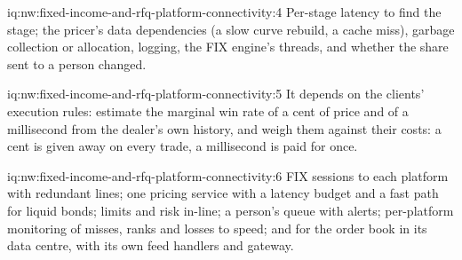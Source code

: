 \begin{solution}{iq:nw:fixed-income-and-rfq-platform-connectivity:4}
Per-stage latency to find the stage; the pricer's data dependencies (a slow curve rebuild, a cache miss), garbage collection or
allocation, logging, the FIX engine's threads, and whether the share sent to a person changed.
\end{solution}

\begin{solution}{iq:nw:fixed-income-and-rfq-platform-connectivity:5}
It depends on the clients' execution rules: estimate the marginal win rate of a cent of price and of a millisecond from the dealer's own
history, and weigh them against their costs: a cent is given away on every trade, a millisecond is paid for once.
\end{solution}

\begin{solution}{iq:nw:fixed-income-and-rfq-platform-connectivity:6}
FIX sessions to each platform with redundant lines; one pricing service with a latency budget and a fast path for liquid bonds; limits
and risk in-line; a person's queue with alerts; per-platform monitoring of misses, ranks and losses to speed;  and
 for the order book in its data centre, with its own feed handlers and gateway.
\end{solution}
